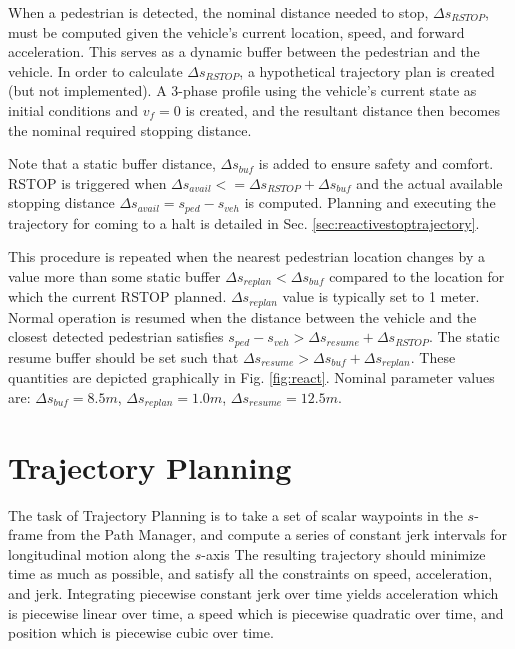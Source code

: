 \documentclass[letterpaper, 10 pt, conference]{ieeeconf}  %
\begin{document}
When a pedestrian is detected, the nominal distance needed to stop, $\Delta s_{RSTOP}$, must be computed given the vehicle's current location, speed, and forward acceleration.
This serves as a dynamic buffer between the pedestrian and the vehicle.
In order to calculate $\Delta s_{RSTOP}$, a hypothetical trajectory plan is created (but not implemented).
A 3-phase profile using the vehicle's current state as initial conditions and $v_f = 0$ is created, and the resultant distance then becomes the nominal required stopping distance.

Note that a static buffer distance, $\Delta s_{buf}$ is added to ensure safety and comfort.
RSTOP is triggered when $\Delta s_{avail} <= \Delta s_{RSTOP} + \Delta s_{buf}$ and the actual available stopping distance $\Delta s_{avail} = s_{ped} - s_{veh}$ is computed.
Planning and executing the trajectory for coming to a halt is detailed in Sec. \ref{sec:reactivestoptrajectory}.

This procedure is repeated when the nearest pedestrian location changes by a value more than some static buffer $\Delta s_{replan} < \Delta s_{buf}$ compared to the location for which the current RSTOP planned.
$\Delta s_{replan}$ value is typically set to 1 meter.
Normal operation is resumed when the distance between the vehicle and the closest detected pedestrian satisfies $s_{ped} - s_{veh} > \Delta s_{resume} + \Delta s_{RSTOP}$. The static resume buffer should be set such that $\Delta s_{resume} > \Delta s_{buf} + \Delta s_{replan}$.
These quantities are depicted graphically in Fig. \ref{fig:react}.
Nominal parameter values are: $\Delta s_{buf} = 8.5 m$, $\Delta s_{replan} = 1.0 m$, $\Delta s_{resume} = 12.5 m$.

\section{Trajectory Planning} \label{sec:trajectoryplanning}

The task of Trajectory Planning is to take a set of scalar waypoints in the $s$-frame from the Path Manager, and compute a series of constant jerk intervals for longitudinal motion along the $s$-axis
The resulting trajectory should minimize time as much as possible, and satisfy all the constraints on speed, acceleration, and jerk.
Integrating piecewise constant jerk over time yields acceleration which is piecewise linear over time, a speed which is piecewise quadratic over time, and position which is piecewise cubic over time.
\end{document}
